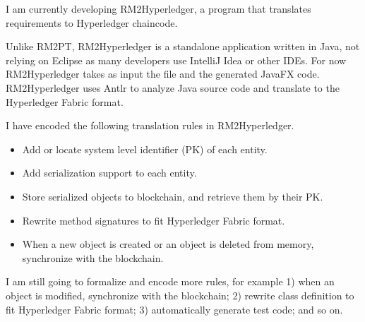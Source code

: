 I am currently developing RM2Hyperledger, a program that translates requirements to Hyperledger chaincode.

Unlike RM2PT, RM2Hyperledger is a standalone application written in Java, not relying on Eclipse as many developers use IntelliJ Idea or other IDEs. For now RM2Hyperledger takes as input the  file and the generated JavaFX code. RM2Hyperledger uses Antlr to analyze Java source code and translate to the Hyperledger Fabric format.

I have encoded the following translation rules in RM2Hyperledger.

\begin{itemize}
\item Add or locate system level identifier (PK) of each entity.
\item Add serialization support to each entity.
\item Store serialized objects to blockchain, and retrieve them by their PK.
\item Rewrite method signatures to fit Hyperledger Fabric format.
\item When a new object is created or an object is deleted from memory, synchronize with the blockchain.
\end{itemize}

I am still going to formalize and encode more rules, for example
1) when an object is modified, synchronize with the blockchain;
2) rewrite class definition to fit Hyperledger Fabric format;
3) automatically generate test code;
and so on.

